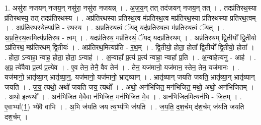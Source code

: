 \documentclass[17pt]{extarticle}
\begin{document}
1. असु॑रा नजयन् नजय॒न् नसु॑रा॒ नसु॑रा नजयन्न् । . अ॒ज॒य॒न् तत् तद॑जयन् नजय॒न् तत् । . तदप्र॑तिरथ॒स्या प्र॑तिरथस्य॒ तत् तदप्र॑तिरथस्य । . अप्र॑तिरथस्या प्रतिरथ॒त्व म॑प्रतिरथ॒त्व मप्र॑तिरथ॒स्या प्र॑तिरथस्या प्रतिरथ॒त्वम् । . अप्र॑तिरथ॒स्येत्यप्र॑ति - र॒थ॒स्य॒ । . अ॒प्र॒ति॒र॒थ॒त्वं ॅयद् यद॑प्रतिरथ॒त्व म॑प्रतिरथ॒त्वं ॅयत् । . अ॒प्र॒ति॒र॒थ॒त्वमित्य॑प्रतिरथ - त्वम् । . यदप्र॑तिरथ॒ मप्र॑तिरथं॒ ॅयद् यदप्र॑तिरथम् । . अप्र॑तिरथम् द्वि॒तीयो᳚ द्वि॒तीयो ऽप्र॑तिरथ॒ मप्र॑तिरथम् द्वि॒तीयः॑ । . अप्र॑तिरथ॒मित्यप्र॑ति - र॒थ॒म् । . द्वि॒तीयो॒ होता॒ होता᳚ द्वि॒तीयो᳚ द्वि॒तीयो॒ होता᳚ । . होता॒ ऽन्वाहा॒ न्वाह॒ होता॒ होता॒ ऽन्वाह॑ । . अ॒न्वाहा᳚ प्र॒त्य॑ प्र॒त्य॑ न्वाहा॒ न्वाहा᳚ प्र॒ति । . अ॒न्वाहेत्य॑नु - आह॑ । . अ॒प्र॒ त्ये॑वैवा प्र॒त्य॑ प्र॒त्ये॑व । . ए॒व तेन॒ तेनै॒ वैव तेन॑ । . तेन॒ यज॑मानो॒ यज॑मान॒ स्तेन॒ तेन॒ यज॑मानः । . यज॑मानो॒ भ्रातृ॑व्या॒न् भ्रातृ॑व्या॒न्॒. यज॑मानो॒ यज॑मानो॒ भ्रातृ॑व्यान् । . भ्रातृ॑व्यान् जयति जयति॒ भ्रातृ॑व्या॒न् भ्रातृ॑व्यान् जयति । . ज॒य॒ त्यथो॒ अथो॑ जयति जय॒ त्यथो᳚ । . अथो॒ अन॑भिजित॒ मन॑भिजित॒ मथो॒ अथो॒ अन॑भिजितम् । . अथो॒ इत्यथो᳚ । . अन॑भिजित मे॒वैवा न॑भिजित॒ मन॑भिजित मे॒व । . अन॑भिजित॒मित्यन॑भि - जि॒त॒म् । . ए॒वाभ्या᳚(1॒) भ्ये॑वै वाभि । . अ॒भि ज॑यति जय त्य॒भ्य॑भि ज॑यति । . ज॒य॒ति॒ द॒श॒र्चम् द॑श॒र्चम् ज॑यति जयति दश॒र्चम् । \newline
\end{document}
